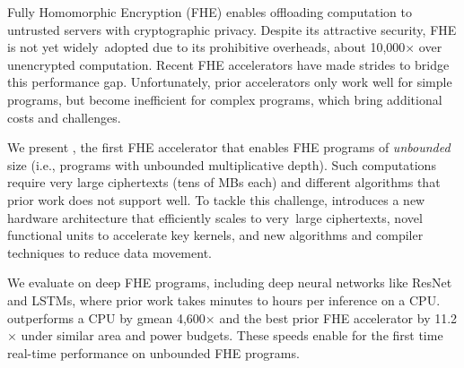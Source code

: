 Fully Homomorphic Encryption (FHE) enables 
offloading computation to untrusted servers with cryptographic privacy.
Despite its attractive security,
FHE is not yet widely~adopted due to its prohibitive overheads,
about 10,000$\times$ over unencrypted computation.
Recent FHE accelerators have made strides to bridge this performance gap.
Unfortunately, prior accelerators only work well for simple programs,
but become inefficient for complex programs,
which bring additional costs and challenges.

We present \name, the first FHE accelerator that enables
FHE programs of \emph{unbounded} size
(i.e., programs with unbounded multiplicative depth).
Such computations require very large ciphertexts (tens of MBs each)
and different algorithms that prior work does not support well.
To tackle this challenge, \name introduces a new hardware architecture
that efficiently scales to very~large ciphertexts,
novel functional units to accelerate key kernels,
and new algorithms and compiler techniques to reduce data movement.

We evaluate \name on deep FHE programs,
including deep neural networks like ResNet and LSTMs,
where prior work takes minutes to hours per inference on a CPU.
\name outperforms a CPU by gmean 4,600$\times$ and
the best prior FHE accelerator by 11.2$\times$ under similar area
and power budgets.
These speeds enable for the first time real-time performance
on unbounded FHE programs.
